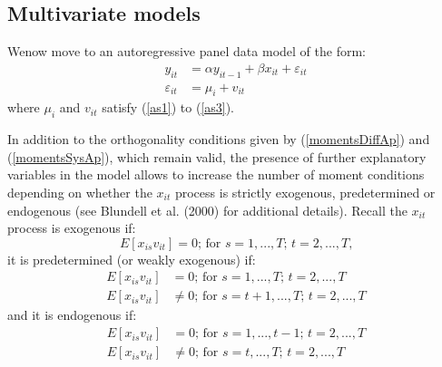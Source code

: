 \documentclass[11pt]{amsart}
\begin{document}

\subsection{Multivariate models}

Wenow move to an autoregressive panel data model of the form:
\begin{equation}
\label{modelarmul}
\tag{8'}
\begin{aligned}
y_{it}&=\alpha y_{it-1} + \beta x_{it} + \varepsilon_{it}\\
\varepsilon_{it}&=\mu _{i}+v_{it}
\end{aligned}
\end{equation}
where $\mu _{i}$ and $v_{it}$ satisfy (\ref{as1}) to (\ref{as3}).

In addition to the orthogonality conditions given by (\ref{momentsDiffAp}) and (\ref{momentsSysAp}), which remain valid, the presence of further explanatory variables in the model allows to increase the number of moment conditions depending on whether the $x_{it}$ process is strictly exogenous, predetermined or endogenous (see Blundell et al. (2000) for additional details). Recall the $x_{it}$ process is exogenous if:
\begin{equation}
\label{ruleexo}
\tag{9'}
E\left[x_{is}v_{it}\right]=0\text{; for $s=1,...,T$; $t=2,...,T$,}
\end{equation}
it is predetermined (or weakly exogenous) if:
\begin{equation}
\label{rulepre}
\tag{10'}
\begin{aligned}
E\left[x_{is}v_{it}\right]&=0\text{; for $s=1,...,T$; $t=2,...,T$}\\
E\left[x_{is}v_{it}\right]&\neq 0\text{; for $s=t+1,...,T$; $t=2,...,T$}
\end{aligned}
\end{equation}
and it is endogenous if:
\begin{equation}
\label{ruleend}
\tag{11'}
\begin{aligned}
E\left[x_{is}v_{it}\right]&=0\text{; for $s=1,...,t-1$; $t=2,...,T$}\\
E\left[x_{is}v_{it}\right]&\neq 0\text{; for $s=t,...,T$; $t=2,...,T$}
\end{aligned}
\end{equation}
\end{document}
